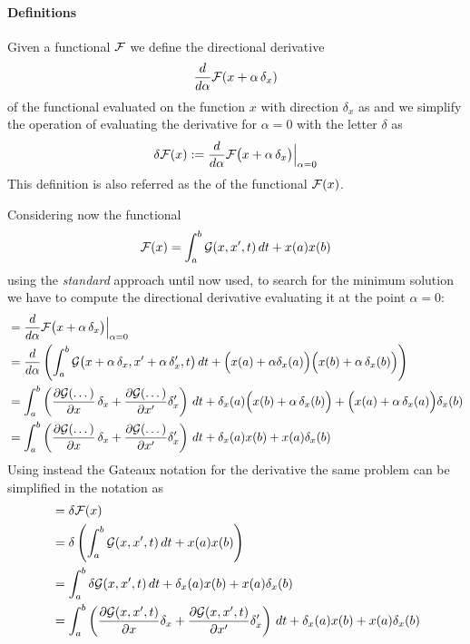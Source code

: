 	\paragraph{Definitions} Given a functional $\mathcal F$ we define the directional derivative
	\[ \frac{d}{d\alpha} \mathcal F(x+\alpha\, \delta_x) \]
	of the functional evaluated on the function $x$ with direction $\delta_x$ as  and we simplify the operation of evaluating the derivative for $\alpha= 0$ with the letter $\delta$ as
	\begin{equation}
		\delta \mathcal F(x) := \frac{d}{d\alpha} \mathcal F\big(x+\alpha\, \delta_x\big) \Big|_{\alpha = 0}
	\end{equation}
	This definition is also referred as the  of the functional $\mathcal F(x)$. \vspace{3mm}
	
	Considering now the functional
	\[ \mathcal F(x) = \int_a^b \mathcal{G}(x,x',t)\, dt + x(a)x(b) \]
	using the \textit{standard} approach until now used, to search for the minimum solution we have to compute the directional derivative evaluating it at the point $\alpha = 0$:
	\begin{align*}
		&= \frac d{d\alpha} \mathcal F \big(x+\alpha\, \delta_x\big) \Big|_{\alpha=0} \\
		&= \frac{d}{d\alpha}\left( \int_a^b \mathcal G\big(x+\alpha\, \delta_x, x' + \alpha\, \delta_x',t\big)\, dt  + \Big(x(a) + \alpha \delta_x(a)\Big)\Big(x(b) + \alpha\, \delta_x(b)\Big) \right) \\
		&=  \int_a^b \left( \frac{\partial \mathcal G(\dots)}{\partial x} \, \delta_x + \frac{\partial \mathcal G(\dots)}{\partial x'} \delta_x' \right) \, dt  + \delta_x(a) \Big(x(b) + \alpha\, \delta_x(b)\Big) + \Big( x(a) + \alpha\,\delta_x(a) \Big)\delta_x(b) \\
		&=  \int_a^b \left( \frac{\partial \mathcal G(\dots)}{\partial x} \, \delta_x + \frac{\partial \mathcal G(\dots)}{\partial x'} \delta_x' \right) \, dt  + \delta_x(a)x(b) + x(a)\delta_x(b)
	\end{align*}
	Using instead the Gateaux notation for the derivative the same problem can be simplified in the notation as
	\begin{align*}
		&= \delta \mathcal F(x) \\
		&= \delta \left(\int_a^b \mathcal{G}(x,x',t)\, dt + x(a)x(b)\right) \\
		&= \int_a^b \delta \mathcal G(x,x',t)\, dt + \delta_x(a) x(b) + x(a)\delta_x(b) \\
		&= \int_a^b \left( \frac{\partial \mathcal G(x,x',t)}{\partial x}\delta_x + \frac{\partial \mathcal G(x,x',t)}{\partial x'} \delta_x' \right)\, dt + \delta_x(a) x(b) + x(a)\delta_x(b)
	\end{align*}

